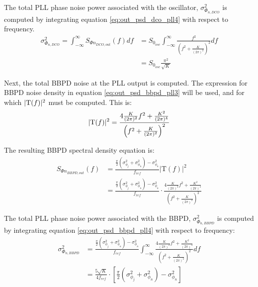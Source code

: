 			The total PLL phase noise power associated with the oscillator, $\sigma_{\Phi_{n,DCO}}^2$ is computed by integrating equation \ref{eq:out_psd_dco_pll4} with respect to frequency.
			\begin{align}\label{eq:out_psd_dco_pll5} 
				\sigma_{\Phi_{n,DCO}}^2 =
				\int_{-\infty}^{\infty} S_{\Phi n_{DCO,out}}(f)df &=
				S_{0_{osc}}\int_{-\infty}^{\infty}\frac{f^2}{\left(f^2+\frac{K}{(2\pi)^2}\right)^2}df
				\\ &= S_{0_{osc}}\frac{\pi^2}{\sqrt{K}} 
			\end{align} 

			Next, the total BBPD noise at the PLL output is computed. The expression for BBPD noise density in equation \ref{eq:out_psd_bbpd_pll3} will be used, and for which $|\textnormal{T}(f)|^2$ must be computed. This is: 
			\begin{equation} 
				|\textnormal{T}(f)|^2 =
				\frac{4\frac{K}{(2\pi)^2}f^2 +
				\frac{K^2}{(2\pi)^4}}{\left(f^2+\frac{K}{(2\pi)^2}\right)^2} 
			\end{equation}

			The resulting BBPD spectral density equation is:
			\begin{align}\label{eq:out_psd_bbpd_pll4} 
				S_{\Phi n_{BBPD,out}}(f) & =
				\frac{\frac{\pi}{2}(\sigma^2_{\phi_j} +
				\sigma^2_{\phi_n})-\sigma^2_{\phi_n}}{f_{ref}}\left|\mathrm{T}(f)\right|^2
				\\&= \frac{\frac{\pi}{2}(\sigma^2_{\phi_j} +
				\sigma^2_{\phi_n})-\sigma^2_{\phi_n}}{f_{ref}}\cdot\frac{4\frac{K}{(2\pi)^2}f^2
				+ \frac{K^2}{(2\pi)^4}}{\left(f^2+\frac{K}{(2\pi)^2}\right)^2} 
			\end{align} 

			The total PLL phase noise power associated with the BBPD, $\sigma_{\Phi_{n,BBPD}}^2$ is computed by integrating equation \ref{eq:out_psd_bbpd_pll4} with respect to frequency:
			\begin{align}\label{eq:out_psd_bbpd_pll5} 
				\sigma_{\Phi_{n,BBPD}}^2 & =
				\frac{\frac{\pi}{2}(\sigma^2_{\phi_j} +
				\sigma^2_{\phi_n})-\sigma^2_{\phi_n}}{f_{ref}}\int_{-\infty}^{\infty}\frac{4\frac{K}{(2\pi)^2}f^2
				+ \frac{K^2}{(2\pi)^4}}{\left(f^2+\frac{K}{(2\pi)^2}\right)^2}df\\ 
				&= \frac{5\sqrt{K}}{4f_{ref}}\cdot\left[\frac{\pi}{2}(\sigma^2_{\phi_j} +
				\sigma^2_{\phi_n})-\sigma^2_{\phi_n}\right] 
			\end{align} 

